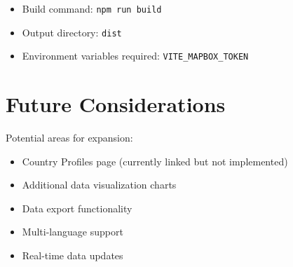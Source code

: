 \documentclass[11pt,a4paper]{article}
\begin{document}
\begin{itemize}
    \item Build command: \texttt{npm run build}
    \item Output directory: \texttt{dist}
    \item Environment variables required: \texttt{VITE\_MAPBOX\_TOKEN}
\end{itemize}

\section{Future Considerations}

Potential areas for expansion:
\begin{itemize}
    \item Country Profiles page (currently linked but not implemented)
    \item Additional data visualization charts
    \item Data export functionality
    \item Multi-language support
    \item Real-time data updates
\end{itemize}
\end{document}
